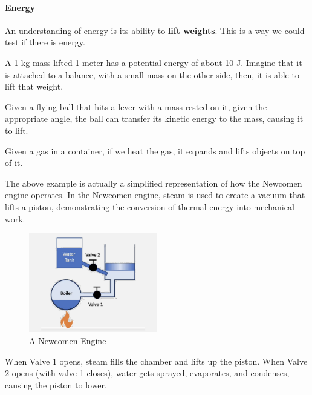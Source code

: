 \documentclass[11pt]{report}
\begin{document}
\paragraph{Energy} An understanding of energy is its ability to \textbf{lift weights}. This is a way we could test if there is energy.
\begin{example}
    A 1 kg mass lifted 1 meter has a potential energy of about 10 J. Imagine that it is attached to a balance, with a small mass on the other side, then, it is able to lift that weight.
\end{example}

\begin{example}
    Given a flying ball that hits a lever with a mass rested on it, given the appropriate angle, the ball can transfer its kinetic energy to the mass, causing it to lift.
\end{example}

\begin{example}[Heat]
    Given a gas in a container, if we heat the gas, it expands and lifts objects on top of it.
\end{example}
\begin{shaded}
\begin{example}
    The above example is actually a simplified representation of how the Newcomen engine operates. In the Newcomen engine, steam is used to create a vacuum that lifts a piston, demonstrating the conversion of thermal energy into mechanical work.
\end{example}
\end{shaded}
\begin{figure}[h!]
    \centering
    \includegraphics[width=0.5\textwidth]{newcomen_engine.png}
    \caption{A Newcomen Engine}
\end{figure}
When Valve 1 opens, steam fills the chamber and lifts up the piston. When Valve 2 opens (with valve 1 closes),
water gets sprayed, evaporates, and condenses, causing the piston to lower.
\end{document}
